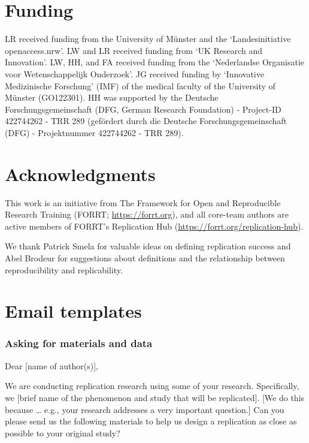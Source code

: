 \documentclass[
  letterpaper,
  DIV=11,
  openany,
  fontsize=12pt,
  parskip=half,
  headings=big,
  numbers=noenddot,
  titlepage=false]{scrreprt}
\begin{document}
\chapter{Funding}\label{funding}

LR received funding from the University of Münster and the
`Landesinitiative openaccess.nrw'. LW and LR received funding from `UK
Research and Innovation'. LW, HH, and FA received funding from the
`Nederlandse Organisatie voor Wetenschappelijk Onderzoek'. JG received
funding by `Innovative Medizinische Forschung' (IMF) of the medical
faculty of the University of Münster (GO122301). HH was supported by the
Deutsche Forschungsgemeinschaft (DFG, German Research Foundation) -
Project-ID 422744262 - TRR 289 (gefördert durch die Deutsche
Forschungsgemeinschaft (DFG) - Projektnummer 422744262 - TRR 289).

\chapter{Acknowledgments}\label{acknowledgments}

This work is an initiative from The Framework for Open and Reproducible
Research Training (FORRT; \url{https://forrt.org}), and all core-team
authors are active members of FORRT's Replication Hub
(\href{https://forrt.org/replication-hub/}{https://forrt.org/replication-hub}).

We thank Patrick Smela for valuable ideas on defining replication
success and Abel Brodeur for suggestions about definitions and the
relationship between reproducibility and replicability.

\chapter{Email templates}\label{email-templates}

\subsection{Asking for materials and
data}\label{asking-for-materials-and-data}

Dear {[}name of author(s){]},

We are conducting replication research using some of your research.
Specifically, we {[}brief name of the phenomenon and study that will be
replicated{]}. {[}We do this because \ldots{} e.g., your research
addresses a very important question.{]} Can you please send us the
following materials to help us design a replication as close as possible
to your original study?
\end{document}
